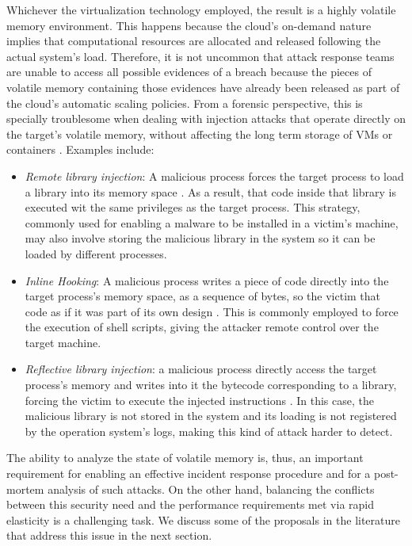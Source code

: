 \documentclass[conference]{IEEEtran}
\begin{document}
Whichever the virtualization technology employed, the result is a highly volatile memory environment.
%
This happens because the cloud's on-demand nature implies that computational resources are allocated and released following the actual system's load.
%
Therefore, it is not uncommon that attack response teams are unable to access all possible evidences of a breach because the pieces of volatile memory containing those evidences have already been released as part of the cloud's automatic scaling policies.
%
From a forensic perspective, this is specially troublesome when dealing with injection attacks that operate directly on the target's volatile memory, without affecting the long term storage of VMs or containers \cite{Case_Memory_Forensics:2014}. 
%
Examples include:

\begin{itemize}
 \item \textit{Remote library injection}: A malicious process forces the target process to load a library into its memory space \cite{Miller_Remote_Library_Injection:2004}.
 As a result, that code inside that library is executed wit the same privileges as the target process. 
 This strategy, commonly used for enabling a malware to be installed in a victim's machine, may also involve storing the malicious library in the system so it can be loaded by different processes.
 \item \textit{Inline Hooking}: A malicious process writes a piece of code directly into the target process's memory space, as a sequence of bytes, so the victim that code as if it was part of its own design \cite{inline-hooking:2008}.
%
This is commonly employed to force the execution of shell scripts, giving the attacker remote control over the target machine.

 \item \textit{Reflective library injection}: a malicious process directly access the target process's memory and writes into it the bytecode corresponding to a library, forcing the victim to execute the injected instructions \cite{reflective-lib-injection:2008}.
 In this case, the malicious library is not stored in the system and its loading is not registered by the operation system's logs, making this kind of attack harder to detect.
\end{itemize}	



The ability to analyze the state of volatile memory is, thus, an important requirement for enabling an effective incident response procedure and for a post-mortem analysis of such attacks.
%
On the other hand, balancing the conflicts between this security need and the performance requirements met via rapid elasticity is a challenging task. 
%
We discuss some of the proposals in the literature that address this issue in the next section.
\end{document}
